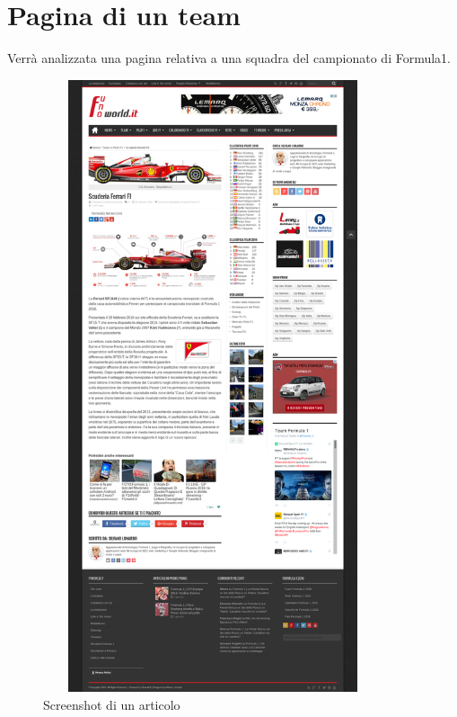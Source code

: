 \section{Pagina di un team}
Verrà analizzata una pagina relativa a una squadra del campionato di Formula1.

\begin{figure}[h] %
  \centering
  \includegraphics[height=18cm, width=10cm]{res/img/TeamPage_Full}
  \caption{Screenshot di un articolo}
\end{figure}
